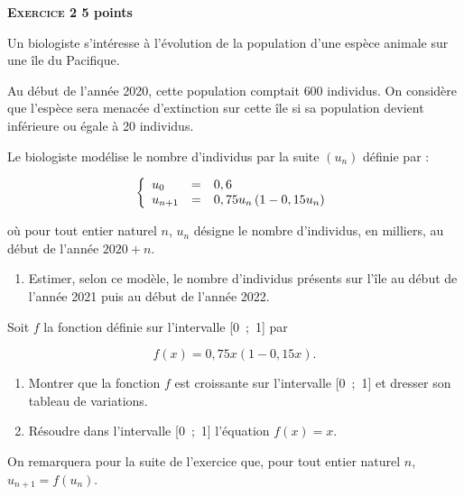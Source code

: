 \documentclass[11pt]{article}
\begin{document}
\textbf{\textsc{Exercice 2} \hfill 5 points}
 
\medskip


Un biologiste s'intéresse à l'évolution de la population d'une espèce animale sur une île du Pacifique.

Au début de l'année 2020, cette population comptait $600$ individus. On considère que l'espèce sera menacée d'extinction sur cette île si sa population devient inférieure ou égale à 20 individus.

\smallskip

Le biologiste modélise le nombre d'individus par la suite $\left(u_n\right)$ définie par : 

\[\left\{\begin{array}{l c l}
u_0		&=	&0,6\\
u_{n+1}	&=	&0,75 u_n\left(1 - 0,15 u_n\right)
\end{array}\right.\]

où pour tout entier naturel $n$, $u_n$ désigne le nombre d'individus, en milliers, au début de l'année $2020 + n$.

\medskip

\begin{enumerate}
\item Estimer, selon ce modèle, le nombre d'individus présents sur l'île au début de l'année 2021 puis au début de l'année 2022.
\end{enumerate}

Soit $f$ la fonction définie sur l'intervalle [0~;~1] par 

\[f(x) = 0,75x (1 - 0,15x).\]

\begin{enumerate}[resume]
\item Montrer que la fonction $f$ est croissante sur l'intervalle [0~;~1] et dresser son tableau de variations.
\item Résoudre dans l'intervalle [0~;~1] l'équation $f(x) = x$.
\end{enumerate}

On remarquera pour la suite de l'exercice que, pour tout entier naturel $n$,\, $u_{n+1} = f\left(u_n\right)$.
\end{document}
